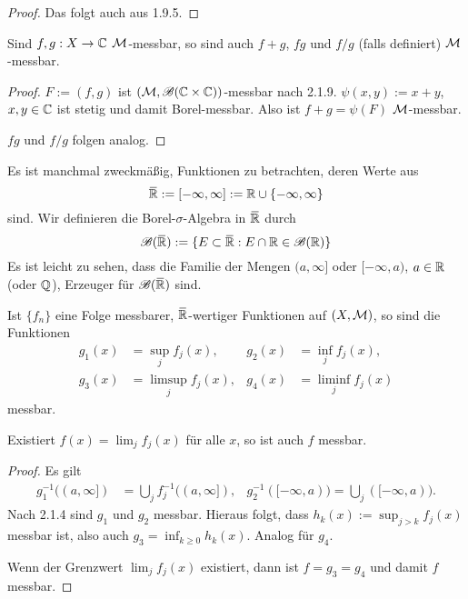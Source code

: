 \begin{proof}
 Das folgt auch aus 1.9.5.
\end{proof}

\begin{folg}
 Sind $f,g: X \to \mathbb{C}$ $\mathcal{M}$-messbar, so sind auch $f+g$, $fg$ und $f/g$ (falls definiert) $\mathcal{M}$-messbar.
\end{folg}

\begin{proof}
 $F := (f,g)$ ist $(\mathcal{M},\mathscr{B}(\mathbb{C} \times \mathbb{C}))$-messbar nach 2.1.9. $\psi(x,y) := x + y$, $x,y \in \mathbb{C}$ ist stetig und damit Borel-messbar. Also ist $f+g = \psi(F)$ $\mathcal{M}$-messbar.
 
 $fg$ und $f/g$ folgen analog.
\end{proof}

Es ist manchmal zweckmäßig, Funktionen zu betrachten, deren Werte aus
\[ \realext := [-\infty,\infty] := \real \cup \{-\infty, \infty\} \]
sind. Wir definieren die Borel-$\sigma$-Algebra in $\realext$ durch 
\[ \borel(\realext) := \{ E \subset \realext : E \cap \real \in \borel( \real ) \} \]
Es ist leicht zu sehen, dass die Familie der Mengen $(a, \infty]$ oder $[-\infty,a)$, $a \in \mathbb{R}$ (oder $\mathbb{Q}$), Erzeuger für $\borel(\realext)$ sind.

\begin{lem}
 Ist $\{f_n\}$ eine Folge messbarer, $\realext$-wertiger Funktionen auf $(X, \mathcal{M})$, so sind die Funktionen 
 \begin{align*}
  g_1(x) &= \sup_j f_j(x), & g_2(x) &= \inf_j f_j(x), \\
  g_3(x) &= \limsup_{j} f_j(x), & g_4(x) &= \liminf_j f_j(x)
 \end{align*}
 messbar.
 
 Existiert $f(x) = \lim_j f_j(x)$ für alle $x$, so ist auch $f$ messbar.
\end{lem}

\begin{proof}
 Es gilt
 \begin{align*}
   g_1^{-1}( (a, \infty] ) &= \bigcup_{j} f_j^{-1} ((a,\infty]), & g_2^{-1}([-\infty,a)) = \bigcup_j ([-\infty,a)).
 \end{align*}
 Nach 2.1.4 sind $g_1$ und $g_2$ messbar. Hieraus folgt, dass $h_k(x) := \sup_{j > k} f_j(x)$ messbar ist, also auch $g_3 = \inf_{k \ge 0} h_k(x)$. Analog für $g_4$.
 
 Wenn der Grenzwert $\lim_j f_j(x)$ existiert, dann ist $f = g_3 = g_4$ und damit $f$ messbar.
\end{proof}

